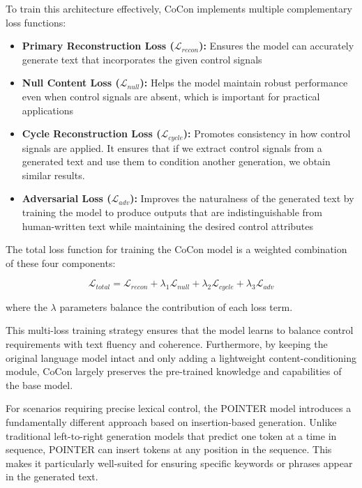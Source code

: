To train this architecture effectively, CoCon implements multiple complementary loss functions:

\begin{itemize}
   \item \textbf{Primary Reconstruction Loss ($\mathcal{L}_{recon}$):} Ensures the model can accurately generate text that incorporates the given control signals
   \item \textbf{Null Content Loss ($\mathcal{L}_{null}$):} Helps the model maintain robust performance even when control signals are absent, which is important for practical applications
   \item \textbf{Cycle Reconstruction Loss ($\mathcal{L}_{cycle}$):} Promotes consistency in how control signals are applied. It ensures that if we extract control signals from a generated text and use them to condition another generation, we obtain similar results.
   \item \textbf{Adversarial Loss ($\mathcal{L}_{adv}$):} Improves the naturalness of the generated text by training the model to produce outputs that are indistinguishable from human-written text while maintaining the desired control attributes
\end{itemize}

The total loss function for training the CoCon model is a weighted combination of these four components:

\begin{equation}
    \mathcal{L}_{total} = \mathcal{L}_{recon} + \lambda_1 \mathcal{L}_{null} + \lambda_2 \mathcal{L}_{cycle} + \lambda_3 \mathcal{L}_{adv}
\end{equation}

where the $\lambda$ parameters balance the contribution of each loss term.

This multi-loss training strategy ensures that the model learns to balance control requirements with text fluency and coherence.
Furthermore, by keeping the original language model intact and only adding a lightweight content-conditioning module, CoCon largely preserves the pre-trained knowledge and capabilities of the base model.

For scenarios requiring precise lexical control, the POINTER model \cite{zhang-etal-2020-pointer} introduces a fundamentally different approach based on insertion-based generation. 
Unlike traditional left-to-right generation models that predict one token at a time in sequence, POINTER can insert tokens at any position in the sequence. 
This makes it particularly well-suited for ensuring specific keywords or phrases appear in the generated text.

